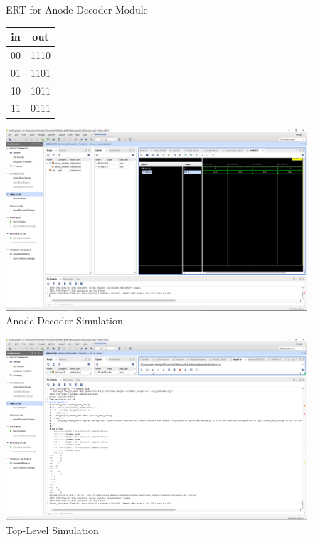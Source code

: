 \documentclass[11pt]{article}
\begin{document}
\begin{figure}[ht]\centering
\caption{ERT for Anode Decoder Module}
		\label{tbl:example_table}
		\begin{tabular}{c|c}
			\toprule
			in & out \\
			\midrule
			00 & 1110 \\
			01 & 1101 \\
			10 & 1011 \\
			11 & 0111 \\
			\bottomrule
		\end{tabular} 
\includegraphics[width=1\textwidth,trim=19cm 15cm 0.5cm 4.5cm,clip]{an_decoder_test_screenshot}
	\caption{Anode Decoder Simulation}
	\label{fig:sim_with_table}
\end{figure}

\begin{figure}[ht]\centering
\includegraphics[width=1\textwidth,trim=7cm 3cm 15cm 10cm,clip]{top_level_sim}
	\caption{Top-Level Simulation}
	\label{fig:sim_with_table}
\end{figure}
\end{document}
